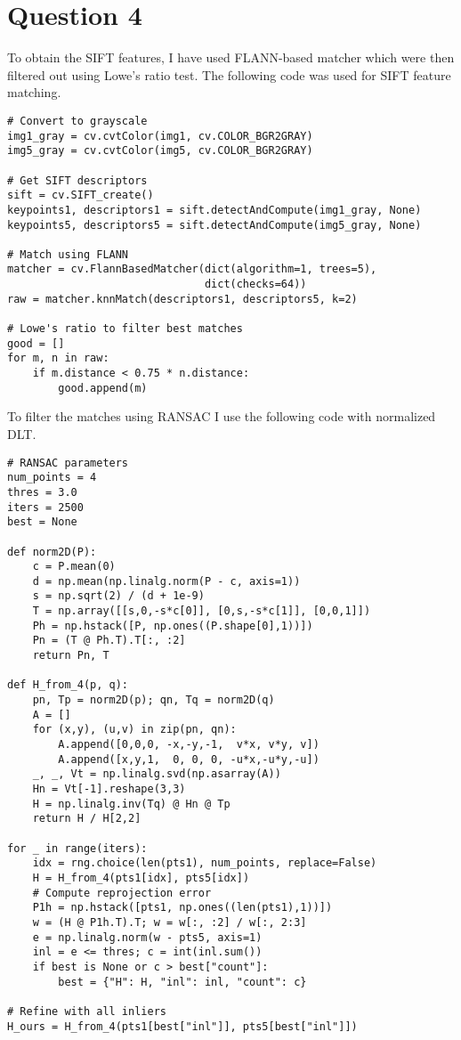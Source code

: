 \documentclass[11pt,a4paper]{article}
\begin{document}
\section*{Question 4}

To obtain the SIFT features, I have used FLANN-based matcher which were then filtered out using Lowe's ratio test. The following code was used for SIFT feature matching.

\begin{lstlisting}
# Convert to grayscale
img1_gray = cv.cvtColor(img1, cv.COLOR_BGR2GRAY)
img5_gray = cv.cvtColor(img5, cv.COLOR_BGR2GRAY)

# Get SIFT descriptors
sift = cv.SIFT_create()
keypoints1, descriptors1 = sift.detectAndCompute(img1_gray, None)
keypoints5, descriptors5 = sift.detectAndCompute(img5_gray, None)

# Match using FLANN
matcher = cv.FlannBasedMatcher(dict(algorithm=1, trees=5), 
                               dict(checks=64))
raw = matcher.knnMatch(descriptors1, descriptors5, k=2)

# Lowe's ratio to filter best matches
good = []
for m, n in raw:
    if m.distance < 0.75 * n.distance:
        good.append(m)
\end{lstlisting}

To filter the matches using RANSAC I use the following code with normalized DLT.

\begin{lstlisting}
# RANSAC parameters
num_points = 4
thres = 3.0
iters = 2500
best = None

def norm2D(P):
    c = P.mean(0)
    d = np.mean(np.linalg.norm(P - c, axis=1))
    s = np.sqrt(2) / (d + 1e-9)
    T = np.array([[s,0,-s*c[0]], [0,s,-s*c[1]], [0,0,1]])
    Ph = np.hstack([P, np.ones((P.shape[0],1))])
    Pn = (T @ Ph.T).T[:, :2]
    return Pn, T

def H_from_4(p, q):
    pn, Tp = norm2D(p); qn, Tq = norm2D(q)
    A = []
    for (x,y), (u,v) in zip(pn, qn):
        A.append([0,0,0, -x,-y,-1,  v*x, v*y, v])
        A.append([x,y,1,  0, 0, 0, -u*x,-u*y,-u])
    _, _, Vt = np.linalg.svd(np.asarray(A))
    Hn = Vt[-1].reshape(3,3)
    H = np.linalg.inv(Tq) @ Hn @ Tp
    return H / H[2,2]

for _ in range(iters):
    idx = rng.choice(len(pts1), num_points, replace=False)
    H = H_from_4(pts1[idx], pts5[idx])
    # Compute reprojection error
    P1h = np.hstack([pts1, np.ones((len(pts1),1))])
    w = (H @ P1h.T).T; w = w[:, :2] / w[:, 2:3]
    e = np.linalg.norm(w - pts5, axis=1)
    inl = e <= thres; c = int(inl.sum())
    if best is None or c > best["count"]:
        best = {"H": H, "inl": inl, "count": c}

# Refine with all inliers
H_ours = H_from_4(pts1[best["inl"]], pts5[best["inl"]])
\end{lstlisting}
\end{document}
